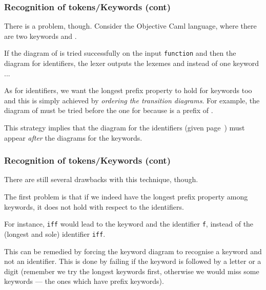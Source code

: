 %
\begin{frame}
\frametitle{Recognition of tokens/Keywords (cont)}

There is a problem, though. Consider the Objective Caml language,
where there are two keywords  and .

\bigskip

If the diagram of  is tried successfully on the input
\texttt{function} and then the diagram for identifiers, the lexer
outputs the lexemes  and  instead of one
keyword ...

\bigskip

As for identifiers, we want the longest prefix property to hold for
keywords too and this is simply achieved by \emph{ordering the
  transition diagrams}. For example, the diagram of 
must be tried before the one for  because  is a
prefix of .

\bigskip

This strategy implies that the diagram for the identifiers (given
page~\pageref{dfa_ident}) must appear \emph{after} the diagrams for
the keywords.

\end{frame}

%
\begin{frame}
\frametitle{Recognition of tokens/Keywords (cont)}

There are still several drawbacks with this technique, though.

\bigskip

The first problem is that if we indeed have the longest prefix
property among keywords, it does not hold with respect to the
identifiers.

\bigskip

For instance, \texttt{iff} would lead to the keyword  and the
identifier \texttt{f}, instead of the (longest and sole)
identifier \texttt{iff}.

\bigskip

This can be remedied by forcing the keyword diagram to recognise a
keyword and not an identifier. This is done by failing if the keyword
is followed by a letter or a digit (remember we try the longest
keywords first, otherwise we would miss some keywords --- the ones
which have prefix keywords).

\end{frame}


